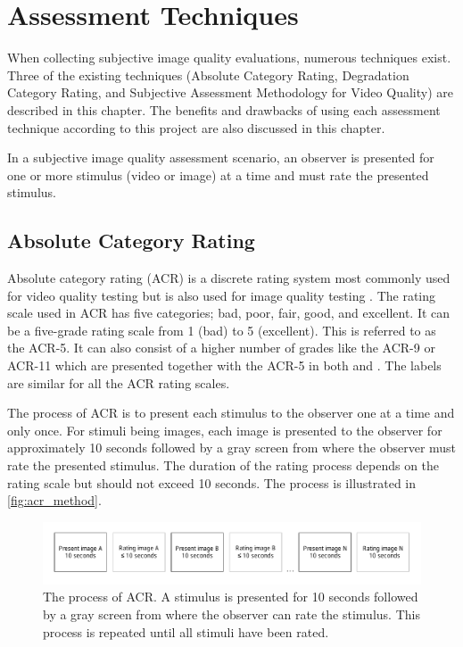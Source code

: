 \graphicspath{{Chapters/AssessmentTechniques/}}

\chapter{Assessment Techniques}

When collecting subjective image quality evaluations, numerous techniques exist. Three of the existing techniques (Absolute Category Rating, Degradation Category Rating, and Subjective Assessment Methodology for Video Quality) are described in this chapter. The benefits and drawbacks of using each assessment technique according to this project are also discussed in this chapter.

In a subjective image quality assessment scenario, an observer is presented for one or more stimulus (video or image) at a time and must rate the presented stimulus. 

\section{Absolute Category Rating} %
\label{sec:acr}

Absolute category rating (ACR) is a discrete rating system most commonly used for video quality testing \cite{ITU-TRecommendationP.9102008} but is also used for image quality testing \cite{Rouse2010}. The rating scale used in ACR has five categories; bad, poor, fair, good, and excellent. It can be a five-grade rating scale from 1 (bad) to 5 (excellent). This is referred to as the ACR-5. It can also consist of a higher number of grades like the ACR-9 or ACR-11 which are presented together with the ACR-5 in both \cite{ITU-TRecommendationP.9102008} and \cite{Rouse2010}. The labels are similar for all the ACR rating scales.

The process of ACR is to present each stimulus to the observer one at a time and only once. For stimuli being images, each image is presented to the observer for approximately 10 seconds followed by a gray screen from where the observer must rate the presented stimulus. The duration of the rating process depends on the rating scale but should not exceed 10 seconds. The process is illustrated in \autoref{fig:acr_method}.

\begin{figure}[H]
	\centering
	\includegraphics[width = \columnwidth]{Img/ACR.pdf}
	\caption{The process of ACR. A stimulus is presented for 10 seconds followed by a gray screen from where the observer can rate the stimulus. This process is repeated until all stimuli have been rated.}
	\label{fig:acr_method}
\end{figure}

